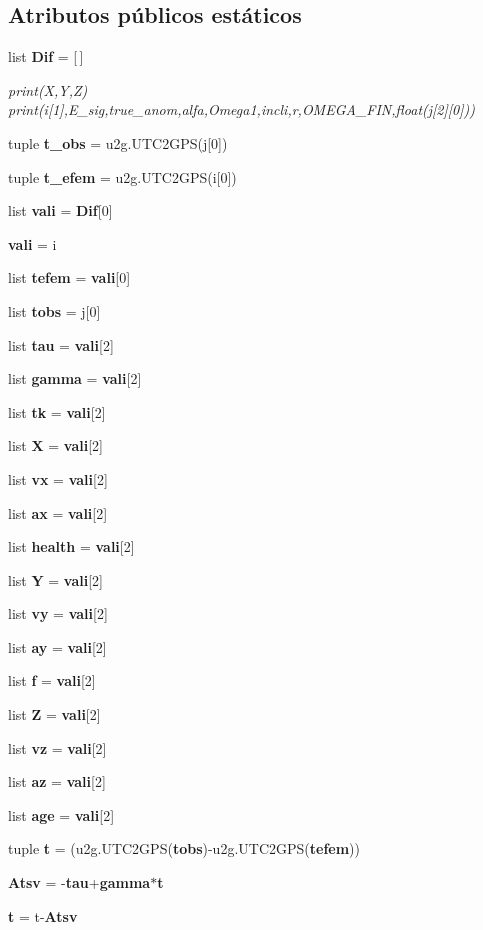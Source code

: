 \subsection*{Atributos públicos estáticos}
\begin{DoxyCompactItemize}
\item 
list {\bf Dif} = [$\,$]
\begin{DoxyCompactList}\small\item\em print(\-X,\-Y,\-Z) print(i[1],\-E\-\_\-sig,true\-\_\-anom,alfa,\-Omega1,incli,r,\-O\-M\-E\-G\-A\-\_\-\-F\-I\-N,float(j[2][0])) \end{DoxyCompactList}\item 
tuple {\bf t\-\_\-obs} = u2g.\-U\-T\-C2\-G\-P\-S(j[0])
\item 
tuple {\bf t\-\_\-efem} = u2g.\-U\-T\-C2\-G\-P\-S(i[0])
\item 
list {\bf vali} = {\bf Dif}[0]
\item 
{\bf vali} = i
\item 
list {\bf tefem} = {\bf vali}[0]
\item 
list {\bf tobs} = j[0]
\item 
list {\bf tau} = {\bf vali}[2]
\item 
list {\bf gamma} = {\bf vali}[2]
\item 
list {\bf tk} = {\bf vali}[2]
\item 
list {\bf X} = {\bf vali}[2]
\item 
list {\bf vx} = {\bf vali}[2]
\item 
list {\bf ax} = {\bf vali}[2]
\item 
list {\bf health} = {\bf vali}[2]
\item 
list {\bf Y} = {\bf vali}[2]
\item 
list {\bf vy} = {\bf vali}[2]
\item 
list {\bf ay} = {\bf vali}[2]
\item 
list {\bf f} = {\bf vali}[2]
\item 
list {\bf Z} = {\bf vali}[2]
\item 
list {\bf vz} = {\bf vali}[2]
\item 
list {\bf az} = {\bf vali}[2]
\item 
list {\bf age} = {\bf vali}[2]
\item 
tuple {\bf t} = (u2g.\-U\-T\-C2\-G\-P\-S({\bf tobs})-\/u2g.\-U\-T\-C2\-G\-P\-S({\bf tefem}))
\item 
{\bf Atsv} = -\/{\bf tau}+{\bf gamma}$\ast${\bf t}
\item 
{\bf t} = t-\/{\bf Atsv}
\end{DoxyCompactItemize}


